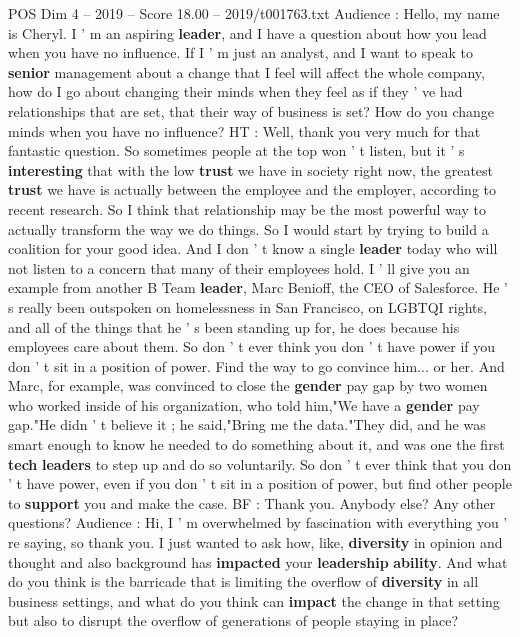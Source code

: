 \begin{textsample}{POS Dim 4 – 2019 – Score 18.00 – 2019/t001763.txt}
Audience : Hello, my name is Cheryl.
I ' m an aspiring \textbf{leader}, and I have a question about how you lead when you have no influence.
If I ' m just an analyst, and I want to speak to \textbf{senior} management about a change that I feel will affect the whole company, how do I go about changing their minds when they feel as if they ' ve had relationships that are set, that their way of business is set?
How do you change minds when you have no influence?
HT : Well, thank you very much for that fantastic question.
So sometimes people at the top won ' t listen, but it ' s \textbf{interesting} that with the low \textbf{trust} we have in society right now, the greatest \textbf{trust} we have is actually between the employee and the employer, according to recent research.
So I think that relationship may be the most powerful way to actually transform the way we do things.
So I would start by trying to build a coalition for your good idea.
And I don ' t know a single \textbf{leader} today who will not listen to a concern that many of their employees hold.
I ' ll give you an example from another B Team \textbf{leader}, Marc Benioff, the CEO of Salesforce.
He ' s really been outspoken on homelessness in San Francisco, on LGBTQI rights, and all of the things that he ' s been standing up for, he does because his employees care about them.
So don ' t ever think you don ' t have power if you don ' t sit in a position of power.
Find the way to go convince him... or her.
And Marc, for example, was convinced to close the \textbf{gender} pay gap by two women who worked inside of his organization, who told him,"We have a \textbf{gender} pay gap."He didn ' t believe it ; he said,"Bring me the data."They did, and he was smart enough to know he needed to do something about it, and was one the first \textbf{tech} \textbf{leaders} to step up and do so voluntarily.
So don ' t ever think that you don ' t have power, even if you don ' t sit in a position of power, but find other people to \textbf{support} you and make the case.
BF : Thank you.
Anybody else?
Any other questions?
Audience : Hi, I ' m overwhelmed by fascination with everything you ' re saying, so thank you.
I just wanted to ask how, like, \textbf{diversity} in opinion and thought and also background has \textbf{impacted} your \textbf{leadership} \textbf{ability}.
And what do you think is the barricade that is limiting the overflow of \textbf{diversity} in all business settings, and what do you think can \textbf{impact} the change in that setting but also to disrupt the overflow of generations of people staying in place?

\end{textsample}
